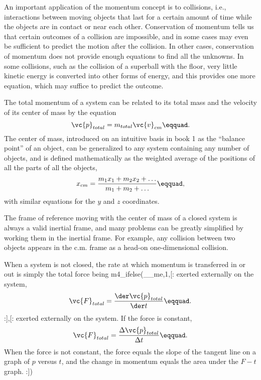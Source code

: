 \begin{summary}
\begin{summarytext}
An important application of the momentum concept is to
collisions, i.e., interactions between moving objects that
last for a certain amount of time while the objects are in
contact or near each other. Conservation of momentum tells
us that certain outcomes of a collision are impossible, and
in some cases may even be sufficient to predict the motion
after the collision. In other cases, conservation of
momentum does not provide enough equations to find all the
unknowns. In some collisions, such as the collision of a
superball with the floor, very little kinetic energy is
converted into other forms of energy, and this provides one
more equation, which may suffice to predict the outcome.

The total momentum of a system can be related to its total
mass and the velocity of its center of mass by the equation
\begin{equation*}
                \vc{p}_{total}  =  m_{total} \vc{v}_{cm}\eqquad.
\end{equation*}
The center of mass, introduced on an intuitive basis in book
1 as the ``balance point'' of an object, can be generalized
to any system containing any number of objects, and is
defined mathematically as the weighted average of the
positions of all the parts of all the objects,
\begin{equation*}
                x_{cm}  =   \frac{m_1x_1+m_2x_2+\ldots}{m_1+m_2+\ldots}\eqquad,
\end{equation*}
with similar equations for the $y$ and $z$ coordinates.

The frame of reference moving with the center of mass of a
closed system is always a valid inertial frame, and many
problems can be greatly simplified by working them in the
inertial frame. For example, any collision between two
objects appears in the c.m. frame as a head-on one-dimensional collision.

When a system is not closed, the rate at which momentum is
transferred in or out is simply the total force being
m4_ifelse(__me,1,[:%
exerted externally on the system,
\begin{equation*}
                \vc{F}_{total}  =  \frac{\der \vc{p}_{total}}{\der t}\eqquad.
\end{equation*}
:],[:%
exerted externally on the system.
If the force is constant,
\begin{equation*}
                \vc{F}_{total}  =  \frac{\Delta \vc{p}_{total}}{\Delta t}\eqquad.
\end{equation*}
When the force is not constant, the force equals the slope
of the tangent line on a graph of $p$ versus $t$, and the
change in momentum equals the area under the $F-t$ graph.
:])

\end{summarytext}

\end{summary}
